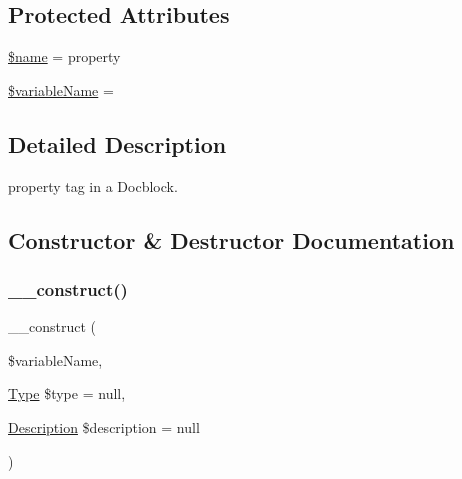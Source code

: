 \subsection*{Protected Attributes}
\begin{DoxyCompactItemize}
\item 
\mbox{\hyperlink{classphp_documentor_1_1_reflection_1_1_doc_block_1_1_tags_1_1_property_ab2fc40d43824ea3e1ce5d86dee0d763b}{\$name}} = \textquotesingle{}property\textquotesingle{}
\item 
\mbox{\hyperlink{classphp_documentor_1_1_reflection_1_1_doc_block_1_1_tags_1_1_property_a34a81eb3c92d37d458c6d18032faee7e}{\$variable\+Name}} = \textquotesingle{}\textquotesingle{}
\end{DoxyCompactItemize}


\subsection{Detailed Description}
property tag in a Docblock. 

\subsection{Constructor \& Destructor Documentation}
\mbox{\label{classphp_documentor_1_1_reflection_1_1_doc_block_1_1_tags_1_1_property_a1e5de5b31a43e9ffe064e27942aa5e63}} 
\subsubsection{\texorpdfstring{\+\_\+\+\_\+construct()}{\_\_construct()}}
{\footnotesize\ttfamily \+\_\+\+\_\+construct (\begin{DoxyParamCaption}\item[{}]{\$variable\+Name,  }\item[{\mbox{\hyperlink{interfacephp_documentor_1_1_reflection_1_1_type}{Type}}}]{\$type = {\ttfamily null},  }\item[{\mbox{\hyperlink{classphp_documentor_1_1_reflection_1_1_doc_block_1_1_description}{Description}}}]{\$description = {\ttfamily null} }\end{DoxyParamCaption})}


